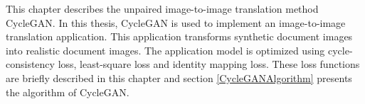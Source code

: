 This chapter describes the unpaired image-to-image translation method \ac{CycleGAN}. In this thesis, \ac{CycleGAN} is used to implement an image-to-image translation application. This application transforms synthetic document images into realistic document images. The application model is optimized using cycle-consistency loss, least-square loss and identity mapping loss. These loss functions are briefly described in this chapter and section \ref{CycleGANAlgorithm} presents the algorithm of \ac{CycleGAN}.

